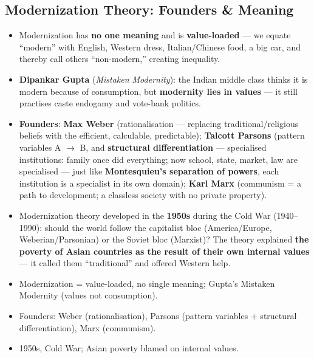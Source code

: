 \sectiondivider

\subsection{Modernization Theory: Founders \& Meaning}

\begin{KeyConcept}
\begin{itemize}
    \item Modernization has \textbf{no one meaning} and is \textbf{value-loaded} --- we equate ``modern'' with English, Western dress, Italian/Chinese food, a big car, and thereby call others ``non-modern,'' creating inequality.
    \item \textbf{Dipankar Gupta} (\textit{Mistaken Modernity}): the Indian middle class thinks it is modern because of consumption, but \textbf{modernity lies in values} --- it still practises caste endogamy and vote-bank politics.
    \item \textbf{Founders}: \textbf{Max Weber} (rationalisation --- replacing traditional/religious beliefs with the efficient, calculable, predictable); \textbf{Talcott Parsons} (pattern variables A $\rightarrow$ B, and \textbf{structural differentiation} --- specialised institutions: family once did everything; now school, state, market, law are specialised --- just like \textbf{Montesquieu's separation of powers}, each institution is a specialist in its own domain); \textbf{Karl Marx} (communism = a path to development; a classless society with no private property).
\end{itemize}
\end{KeyConcept}

\begin{KeyConcept}
\begin{itemize}
    \item Modernization theory developed in the \textbf{1950s} during the Cold War (1940--1990): should the world follow the capitalist bloc (America/Europe, Weberian/Parsonian) or the Soviet bloc (Marxist)? The theory explained \textbf{the poverty of Asian countries as the result of their own internal values} --- it called them ``traditional'' and offered Western help.
\end{itemize}
\end{KeyConcept}

\begin{QuickRevision}
\begin{itemize}
    \item Modernization = value-loaded, no single meaning; Gupta's Mistaken Modernity (values not consumption).
    \item Founders: Weber (rationalisation), Parsons (pattern variables + structural differentiation), Marx (communism).
    \item 1950s, Cold War; Asian poverty blamed on internal values.
\end{itemize}
\end{QuickRevision}

